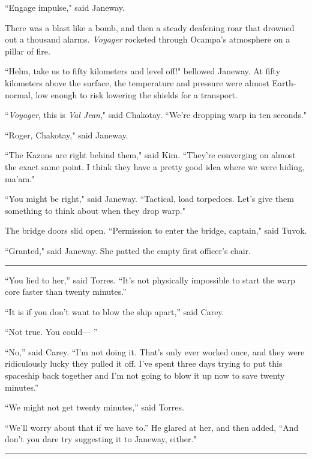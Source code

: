 \documentclass[twoside,letterpaper,12pt]{memoir}
\begin{document}
``Engage impulse," said Janeway.

There was a blast like a bomb, and then a steady deafening roar that drowned out a thousand alarms. \textit{Voyager} rocketed through Ocampa's atmosphere on a pillar of fire.

``Helm, take us to fifty kilometers and level off!" bellowed Janeway. At fifty kilometers above the surface, the temperature and pressure were almost Earth-normal, low enough to risk lowering the shields for a transport.

``\textit{Voyager}, this is \textit{Val Jean}," said Chakotay. ``We're dropping warp in ten seconds."

``Roger, Chakotay," said Janeway.

``The Kazons are right behind them," said Kim. ``They're converging on almost the exact same point. I think they have a pretty good idea where we were hiding, ma'am."

``You might be right," said Janeway. ``Tactical, load torpedoes. Let's give them something to think about when they drop warp."

The bridge doors slid open. ``Permission to enter the bridge, captain," said Tuvok.

``Granted," said Janeway. She patted the empty first officer's chair.

\begin{center}\rule{3cm}{0.4 pt}\end{center}

``You lied to her,” said Torres. ``It’s not physically impossible to start the warp core faster than twenty minutes.”

``It is if you don’t want to blow the ship apart,” said Carey.

``Not true. You could--- ”

``No,” said Carey. ``I’m not doing it. That’s only ever worked once, and they were ridiculously lucky they pulled it off. I’ve spent three days trying to put this spaceship back together and I’m not going to blow it up now to save twenty minutes.”

``We might not get twenty minutes,” said Torres.

``We’ll worry about that if we have to.” He glared at her, and then added, ``And don't you dare try suggesting it to Janeway, either."

\begin{center}\rule{3cm}{0.4 pt}\end{center}
\end{document}
